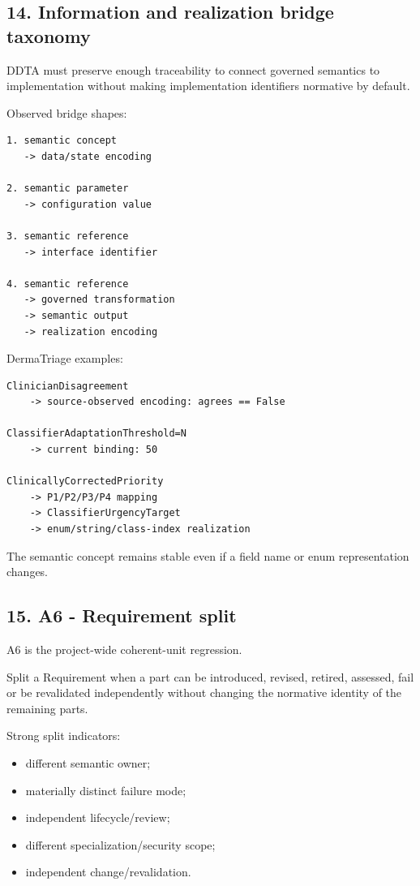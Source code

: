 \documentclass[11pt,a4paper]{article}
\providecommand{\tightlist}{\setlength{\itemsep}{0pt}\setlength{\parskip}{0pt}}
\begin{document}
\subsection{14. Information and realization bridge
taxonomy}\label{14-information-and-realization-bridge-taxonomy}

DDTA must preserve enough traceability to connect governed semantics to
implementation without making implementation identifiers normative by
default.

Observed bridge shapes:

\begin{verbatim}
1. semantic concept
   -> data/state encoding

2. semantic parameter
   -> configuration value

3. semantic reference
   -> interface identifier

4. semantic reference
   -> governed transformation
   -> semantic output
   -> realization encoding
\end{verbatim}

DermaTriage examples:

\begin{verbatim}
ClinicianDisagreement
    -> source-observed encoding: agrees == False

ClassifierAdaptationThreshold=N
    -> current binding: 50

ClinicallyCorrectedPriority
    -> P1/P2/P3/P4 mapping
    -> ClassifierUrgencyTarget
    -> enum/string/class-index realization
\end{verbatim}

The semantic concept remains stable even if a field name or enum
representation changes.

\subsection{15. A6 - Requirement split}\label{15-a6---requirement-split}

A6 is the project-wide coherent-unit regression.

Split a Requirement when a part can be introduced, revised, retired,
assessed, fail or be revalidated independently without changing the
normative identity of the remaining parts.

Strong split indicators:

\begin{itemize}
\tightlist
\item
  different semantic owner;
\item
  materially distinct failure mode;
\item
  independent lifecycle/review;
\item
  different specialization/security scope;
\item
  independent change/revalidation.
\end{itemize}
\end{document}
